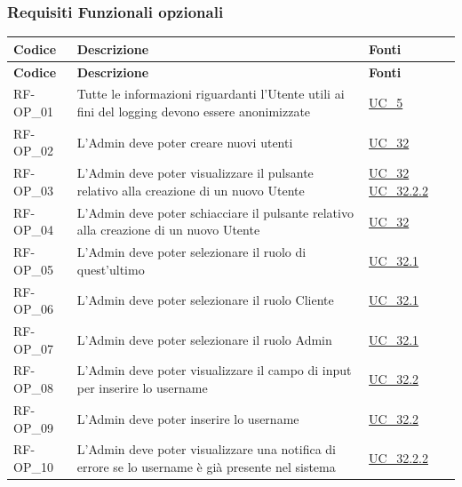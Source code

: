 \subsubsection{Requisiti Funzionali opzionali}
\renewcommand{\arraystretch}{1.15}
\begin{longtable}{|>{\raggedright}p{}|>{\raggedright\arraybackslash}p{}|>{\raggedright\arraybackslash}p{}|}
	\hline
	\rowcolor[gray]{0.9}
	\textbf{Codice} & \textbf{Descrizione} & \textbf{Fonti} \\
	\hline
	\endfirsthead
	
	\hline
	\rowcolor[gray]{0.9}
	\textbf{Codice} & \textbf{Descrizione} & \textbf{Fonti}  \\
	\hline
	\endhead
	
	\hline
	RF-OP\_01 \hypertarget{rf-op_1} & Tutte le informazioni riguardanti l'Utente utili ai fini del logging devono essere anonimizzate & \hyperref[uc_05]{UC\_5} \\
	\hline
	RF-OP\_02 \hypertarget{rf-op_2} & L'Admin deve poter creare nuovi utenti & \hyperref[uc_32]{UC\_32} \\
	\hline
	RF-OP\_03 \hypertarget{rf-op_3} & L'Admin deve poter visualizzare il pulsante relativo alla creazione di un nuovo Utente & \hyperref[uc_32]{UC\_32} \newline \hyperref[uc_32.2.2]{UC\_32.2.2}\\
	\hline
	RF-OP\_04 \hypertarget{rf-op_4} & L'Admin deve poter schiacciare il pulsante relativo alla creazione di un nuovo Utente & \hyperref[uc_32]{UC\_32} \\
	\hline
	RF-OP\_05 \hypertarget{rf-op_5} & L'Admin deve poter selezionare il ruolo di quest'ultimo & \hyperref[uc_32.1]{UC\_32.1} \\
	\hline
	RF-OP\_06 \hypertarget{rf-op_6} & L'Admin deve poter selezionare il ruolo Cliente & \hyperref[uc_32.1]{UC\_32.1} \\
	\hline
	RF-OP\_07 \hypertarget{rf-op_7} & L'Admin deve poter selezionare il ruolo Admin & \hyperref[uc_32.1]{UC\_32.1} \\
	\hline
	RF-OP\_08 \hypertarget{rf-op_8} & L'Admin deve poter visualizzare il campo di input per inserire lo username & \hyperref[uc_32.2]{UC\_32.2} \\
	\hline
	RF-OP\_09 \hypertarget{rf-op_9} & L'Admin deve poter inserire lo username & \hyperref[uc_32.2]{UC\_32.2} \\
	\hline
	RF-OP\_10 \hypertarget{rf-op_10} & L'Admin deve poter visualizzare una notifica di errore se lo username è già presente nel sistema & \hyperref[uc_32.2.2]{UC\_32.2.2} \\

\end{longtable}
